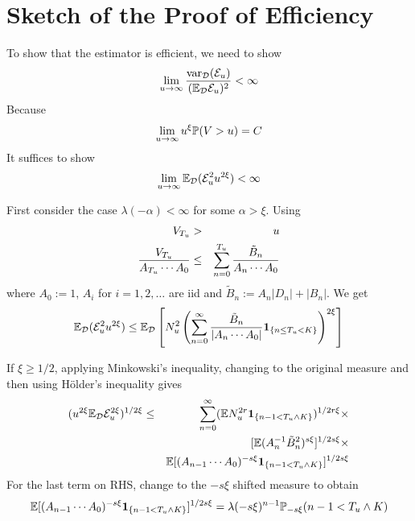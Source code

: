 \documentclass{beamer}
\begin{document}
\section{Sketch of the Proof of Efficiency}
\begin{frame}
  To show that the estimator is efficient, we need to show
  \[
  \lim_{u \to \infty} {
    \var_{\mathcal D}(\mathcal E_u)
    \over
    (\E_{\mathcal D} \mathcal E_u)^2
  } < \infty
  \]
  Because
  \[
  \lim_{u \to \infty} u^\xi \P(V > u) = C
  \]
  It suffices to show
  \[
  \lim_{u \to \infty}
    \E_{\mathcal D}(\mathcal E_u^2 u^{2\xi}) < \infty
  \]
\end{frame}

\begin{frame}
  First consider the case $\lambda(-\alpha) < \infty$ for some $\alpha
  > \xi$. Using
  \begin{eqnarray*}
    V_{T_u} &>& u \\
    {V_{T_u}
      \over
      A_{T_u} \cdots A_0
    } &\leq& \sum_{n=0}^{T_u} {
      \tilde B_n
      \over
      A_n \cdots A_0
    }
  \end{eqnarray*}
  where $A_{0} := 1$, $A_i$ for $i =1, 2, \dots$ are iid and $\tilde B_n :=
  A_n |D_n| + |B_n|$. We get
  \[
  \E_{\mathcal D}(\mathcal E_u^2 u^{2\xi}) \leq
  \E_{\mathcal D} \left[
    N_u^2
    \left(
    \sum_{n=0}^{\infty} {
      \tilde B_n
      \over
      |A_n \cdots A_0|
    }
    \1{n \leq T_u < K}
    \right)^{2\xi}
    \right]
  \]
\end{frame}

\begin{frame}
  If $\xi \geq 1/2$, applying Minkowski's inequality, changing to
  the original measure and then using H\"older's inequality gives
  \begin{eqnarray*}
    (u^{2\xi} \E_{\mathcal D} \mathcal{E}^{2\xi}_u)^{1/2\xi} &\leq&
    \sum_{n=0}^\infty
    (\E N_u^{2r} \1{n-1 < T_u \wedge K})^{1/2r\xi} \times \\
    && [\E (A_n^{-1} \tilde B_n^2)^{s\xi}]^{1/2s\xi} \times \\
    && \E[
    (A_{n-1} \cdots A_0)^{-s\xi}
    \1{n-1 < T_u \wedge K}
    ]^{1/2s\xi}
  \end{eqnarray*}
  For the last term on RHS, change to the $-s\xi$ shifted measure to
  obtain
  \[
  \E[
    (A_{n-1} \cdots A_0)^{-s\xi}
    \1{n-1 < T_u \wedge K}
    ]^{1/2s\xi} = \lambda(-s\xi)^{n-1} \P_{-s\xi}(n-1 < T_u \wedge K)
  \]
\end{frame}
\end{document}
